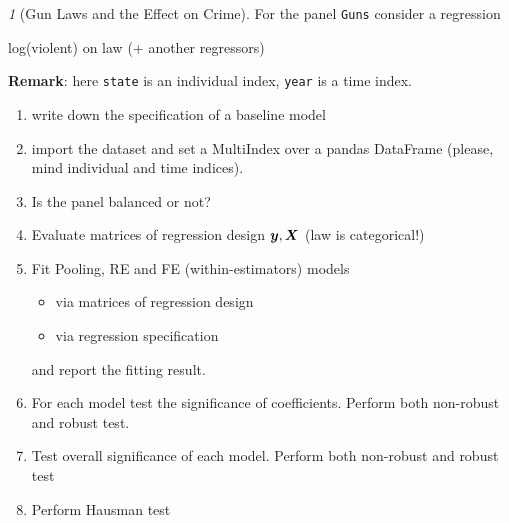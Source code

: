 \documentclass[12pt]{article}
\theoremstyle{remark}
\newtheorem{exercise}{}[section]
\begin{document}
\begin{exercise}[Gun Laws and the Effect on Crime]
For the panel \texttt{Guns} consider a regression
\begin{center}
	log(violent) on law (+ another regressors) 
\end{center}
\textbf{Remark}: here \texttt{state} is an individual index, 
\texttt{year} is a time index.
\begin{enumerate}
	\item write down the specification of a baseline model
	\item import the dataset and set a MultiIndex over a pandas DataFrame 
	(please, mind  individual and time indices).
	\item Is the panel balanced or not?
	\item Evaluate matrices of regression design \({\bm y}, {\bm X}\) (law is categorical!)
	\item Fit Pooling, RE and FE (within-estimators) models
	\begin{itemize}
		\item via matrices of regression design
		\item via regression specification
	\end{itemize}
	and report the fitting result.
	\item For each model test the significance of coefficients. Perform both
	non-robust and robust test.
	\item Test overall significance of each model. Perform both
	non-robust and robust test
	\item Perform Hausman test
\end{enumerate}
\end{exercise}
\end{document}
